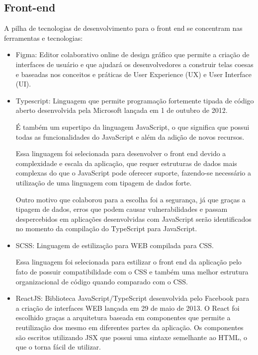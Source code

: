 \documentclass[
    12pt,               %
    openright,          %
    oneside,
    a4paper,            %
    BIBLATEX,           %
    TODO,               %
    english,            %
    brazil              %
    ]{ifsp-spo-inf-ctds}
\begin{document}
    \subsection{Front-end}
    
        A pilha de tecnologias de desenvolvimento para o front end se concentram nas ferramentas e tecnologias:
        
        \begin{itemize}
        
            \item Figma: Editor colaborativo online de design gráfico que permite a criação de interfaces de usuário e que ajudará os desenvolvedores a construir telas coesas e baseadas nos conceitos e práticas de User Experience (UX) e User Interface (UI).
        
            \item Typescript:
                Linguagem que permite programação fortemente tipada de código aberto desenvolvida pela Microsoft lançada em 1 de outubro de 2012. 
    
                É também um supertipo da linguagem  JavaScript, o que significa que possui todas as funcionalidades do JavaScript e além da adição de novos recursos. 
                
                Essa linguagem foi selecionada para desenvolver o front end devido a complexidade e escala da aplicação, que requer estruturas de dados mais complexas do que o JavaScript pode oferecer suporte, fazendo-se necessário a utilização de uma linguagem com tipagem de dados forte. 
                
                Outro motivo que colaborou para a escolha foi a segurança, já que graças a tipagem de dados, erros que podem causar vulnerabilidades e passam despercebidos em aplicações desenvolvidas com JavaScript serão identificados no momento da compilação do TypeScript para JavaScript.
            
            \item SCSS:
                Linguagem de estilização para WEB compilada para CSS.
    
                Essa linguagem foi selecionada para estilizar o front end da aplicação pelo fato de possuir compatibilidade com o CSS e também uma melhor estrutura organizacional de código quando comparado com o CSS.
        
            \item ReactJS:
                Biblioteca JavaScript/TypeScript desenvolvida pelo Facebook para a criação de interfaces WEB lançada em 29 de maio de 2013. O React foi escolhido graças a arquitetura baseada em componentes que permite a reutilização dos mesmo em diferentes partes da aplicação. Os componentes são escritos utilizando JSX que possui uma sintaxe semelhante ao HTML, o que o torna fácil de utilizar.
        

\end{itemize}
\end{document}
